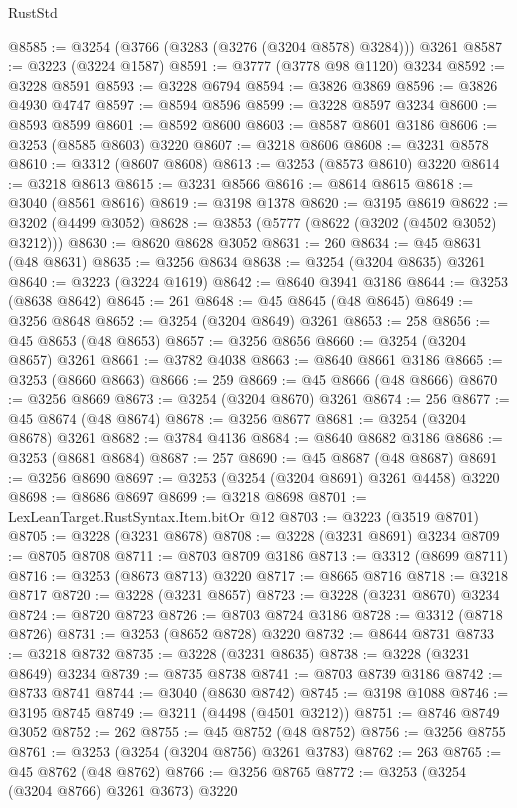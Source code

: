 \begin{lexlean}{RustStd}
\begin{coremodule}
@8585 := @3254 (@3766 (@3283 (@3276 (@3204 @8578) @3284))) @3261
@8587 := @3223 (@3224 @1587)
@8591 := @3777 (@3778 @98 @1120) @3234
@8592 := @3228 @8591
@8593 := @3228 @6794
@8594 := @3826 @3869
@8596 := @3826 @4930 @4747
@8597 := @8594 @8596
@8599 := @3228 @8597 @3234
@8600 := @8593 @8599
@8601 := @8592 @8600
@8603 := @8587 @8601 @3186
@8606 := @3253 (@8585 @8603) @3220
@8607 := @3218 @8606
@8608 := @3231 @8578
@8610 := @3312 (@8607 @8608)
@8613 := @3253 (@8573 @8610) @3220
@8614 := @3218 @8613
@8615 := @3231 @8566
@8616 := @8614 @8615
@8618 := @3040 (@8561 @8616)
@8619 := @3198 @1378
@8620 := @3195 @8619
@8622 := @3202 (@4499 @3052)
@8628 := @3853 (@5777 (@8622 (@3202 (@4502 @3052) @3212)))
@8630 := @8620 @8628 @3052
@8631 := 260
@8634 := @45 @8631 (@48 @8631)
@8635 := @3256 @8634
@8638 := @3254 (@3204 @8635) @3261
@8640 := @3223 (@3224 @1619)
@8642 := @8640 @3941 @3186
@8644 := @3253 (@8638 @8642)
@8645 := 261
@8648 := @45 @8645 (@48 @8645)
@8649 := @3256 @8648
@8652 := @3254 (@3204 @8649) @3261
@8653 := 258
@8656 := @45 @8653 (@48 @8653)
@8657 := @3256 @8656
@8660 := @3254 (@3204 @8657) @3261
@8661 := @3782 @4038
@8663 := @8640 @8661 @3186
@8665 := @3253 (@8660 @8663)
@8666 := 259
@8669 := @45 @8666 (@48 @8666)
@8670 := @3256 @8669
@8673 := @3254 (@3204 @8670) @3261
@8674 := 256
@8677 := @45 @8674 (@48 @8674)
@8678 := @3256 @8677
@8681 := @3254 (@3204 @8678) @3261
@8682 := @3784 @4136
@8684 := @8640 @8682 @3186
@8686 := @3253 (@8681 @8684)
@8687 := 257
@8690 := @45 @8687 (@48 @8687)
@8691 := @3256 @8690
@8697 := @3253 (@3254 (@3204 @8691) @3261 @4458) @3220
@8698 := @8686 @8697
@8699 := @3218 @8698
@8701 := LexLeanTarget.RustSyntax.Item.bitOr @12
@8703 := @3223 (@3519 @8701)
@8705 := @3228 (@3231 @8678)
@8708 := @3228 (@3231 @8691) @3234
@8709 := @8705 @8708
@8711 := @8703 @8709 @3186
@8713 := @3312 (@8699 @8711)
@8716 := @3253 (@8673 @8713) @3220
@8717 := @8665 @8716
@8718 := @3218 @8717
@8720 := @3228 (@3231 @8657)
@8723 := @3228 (@3231 @8670) @3234
@8724 := @8720 @8723
@8726 := @8703 @8724 @3186
@8728 := @3312 (@8718 @8726)
@8731 := @3253 (@8652 @8728) @3220
@8732 := @8644 @8731
@8733 := @3218 @8732
@8735 := @3228 (@3231 @8635)
@8738 := @3228 (@3231 @8649) @3234
@8739 := @8735 @8738
@8741 := @8703 @8739 @3186
@8742 := @8733 @8741
@8744 := @3040 (@8630 @8742)
@8745 := @3198 @1088
@8746 := @3195 @8745
@8749 := @3211 (@4498 (@4501 @3212))
@8751 := @8746 @8749 @3052
@8752 := 262
@8755 := @45 @8752 (@48 @8752)
@8756 := @3256 @8755
@8761 := @3253 (@3254 (@3204 @8756) @3261 @3783)
@8762 := 263
@8765 := @45 @8762 (@48 @8762)
@8766 := @3256 @8765
@8772 := @3253 (@3254 (@3204 @8766) @3261 @3673) @3220

\end{coremodule}
\end{lexlean}
